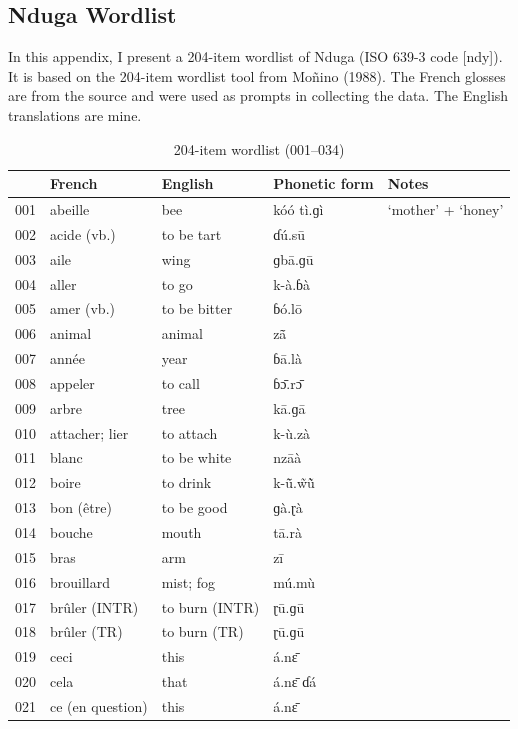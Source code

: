 \documentclass[output=paper,colorlinks,citecolor=brown
]{langscibook}
\begin{document}
\begin{paperappendix}
\section{Nduga Wordlist}
\label{sec:olson:appendix}

In this appendix, I present a 204-item wordlist of Nduga (ISO 639-3 code [ndy]). It is based on the 204-item wordlist tool from Moñino (1988). The French glosses are from the source and were used as prompts in collecting the data. The English translations are mine.

\begin{table}
\caption{204-item wordlist (001–034)}
\label{tab:olson:wordlist}
 \begin{tabular}{lllll}
  \lsptoprule
 & French & English & Phonetic form & Notes \\
  \midrule
001 & abeille & bee & kóó tì.ɡì & ‘mother’ + ‘honey’ \\
002	& acide (vb.) & to be tart & ɗú.sū & \\
003	& aile & wing & ɡbā.ɡū & \\
004 & aller & to go & k-à.ɓà & \\
005	& amer (vb.) & to be bitter & ɓó.lō & \\
006	& animal & animal & zã̄ & \\
007	& année	& year & ɓā.là & \\
008	& appeler & to call & ɓɔ̄.rɔ̄ & \\
009	& arbre & tree & kā.ɡā & \\
010	& attacher; lier & to attach & k-ù.zà & \\
011	& blanc	& to be white & nzāà & \\
012	& boire	& to drink & k-ũ̄.w̃ũ̀ & \\
013	& bon (être) & to be good & ɡà.ɽà & \\
014	& bouche & mouth & tā.rà & \\
015	& bras & arm & zī & \\
016	& brouillard & mist; fog & mú.mù & \\
017	& brûler (INTR) & to burn (INTR) & ɽū.ɡū & \\
018	& brûler (TR) & to burn (TR) & ɽū.ɡū & \\
019	& ceci & this & á.nɛ̄ & \\
020	& cela & that & á.nɛ̄ ɗá & \\
021	& ce (en question) & this & á.nɛ̄ & \\

\end{tabular}
\end{table}
\end{paperappendix}
\end{document}
